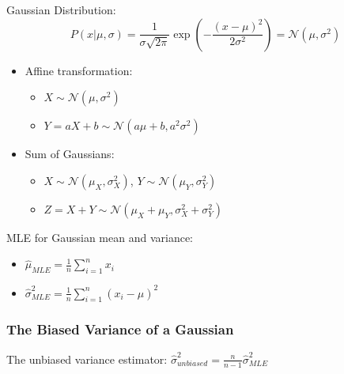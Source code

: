 \documentclass[letterpaper,10pt]{article}
\begin{document}
Gaussian Distribution:
$$P(x|\mu,\sigma)=\frac{1}{\sigma\sqrt{2\pi}}\exp(-\frac{(x-\mu)^2}{2\sigma^2})=\mathcal{N}(\mu,\sigma^2)$$
\begin{itemize}
	\item Affine transformation:
	\begin{itemize}
		\item $X \sim \mathcal{N}(\mu,\sigma^2)$
		\item $Y=aX+b \sim \mathcal{N}(a\mu+b,a^2\sigma^2)$
	\end{itemize}
	\item Sum of Gaussians:
	\begin{itemize}
		\item $X \sim \mathcal{N}(\mu_X,\sigma^2_X)$, $Y \sim \mathcal{N}(\mu_Y,\sigma^2_Y)$
		\item $Z=X+Y \sim \mathcal{N}(\mu_X+\mu_Y,\sigma^2_X+\sigma^2_Y)$
	\end{itemize}
\end{itemize}

MLE for Gaussian mean and variance:
\begin{itemize}
	\item $\hat{\mu}_{MLE}=\frac{1}{n}\sum_{i=1}^{n}{x_i}$
	\item $\hat{\sigma}^2_{MLE}=\frac{1}{n}\sum_{i=1}^{n}{(x_i-\hat{\mu})^2}$
\end{itemize}

\subsubsection{The Biased Variance of a Gaussian}

The unbiased variance estimator:
$\hat{\sigma}^2_{unbiased}=\frac{n}{n-1}\hat{\sigma}^2_{MLE}$
\end{document}
